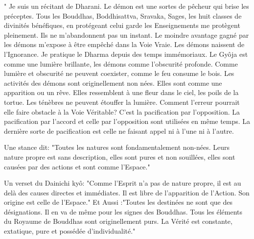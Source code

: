 " Je suis un récitant de Dharani. Le démon est une sortes de pêcheur qui brise les préceptes. Tous les Bouddhas, Boddhisattva, Sravaka, Sages, les huit classes de divinités bénéfiques, en protégeant celui garde les Enseignements me protègent pleinement. Ils ne m'abandonnent pas un instant. Le moindre avantage gagné par les démons m'expose à être empêché dans la Voie Vraie. Les démons naissent de l'Ignorance. Je pratique le Dharma depuis des temps immémoriaux. Le Gyôja est comme une lumière brillante, les démons comme l'obscurité profonde. Comme lumière et obscurité ne peuvent coexister, comme le feu consume le bois. Les activités des démons sont originellement non nées. Elles sont comme une apparition ou un rêve. Elles ressemblent à une fleur dans le ciel, les poils de la tortue. Les ténèbres ne peuvent étouffer la lumière. Comment l'erreur pourrait elle faire obstacle à la Voie Véritable? C'est la pacification par l'opposition.
La pacification par l'accord et celle par l'opposition sont utilisées en même temps. La dernière sorte de pacification est celle ne faisant appel ni à l'une ni à l'autre.

Une stance dit:  "Toutes les natures sont fondamentalement non-nées. Leurs nature propre est sans description, elles sont pures et non souillées, elles sont causées par des actions et sont comme l'Espace."

Un verset du Dainichi kyô:
 "Comme l'Esprit n'a pas de nature propre, il est au delà des causes directes et immédiates. Il est libre de l'apparition de l'Action. Son origine est celle de l'Espace." Et Aussi :"Toutes les destinées ne sont que des désignations. Il en va de même pour les signes des Bouddhas. Tous les éléments du Royaume de Bouddhas sont originellement purs. La Vérité est constante, extatique, pure et possédée d'individualité."

